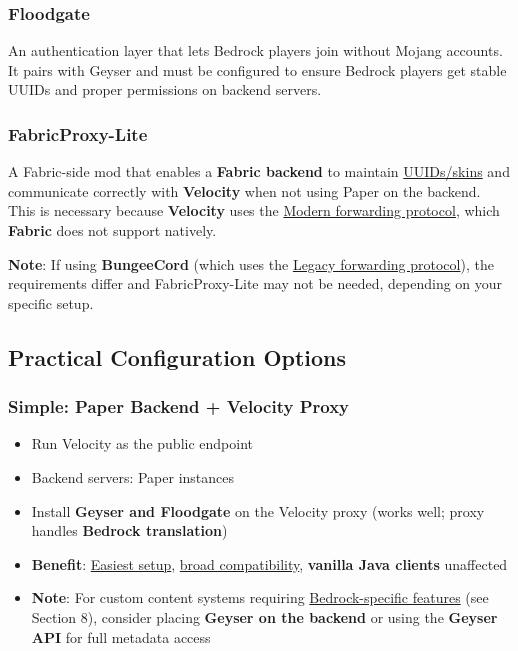 \documentclass{article}
\begin{document}
\subsubsection{Floodgate}

An authentication layer that lets Bedrock players join without Mojang accounts. It pairs with Geyser and must be configured to ensure Bedrock players get stable UUIDs and proper permissions on backend servers.

\subsubsection{FabricProxy-Lite}

A Fabric-side mod that enables a \textbf{Fabric backend} to maintain \uline{UUIDs/skins} and communicate correctly with \textbf{Velocity} when not using Paper on the backend. This is necessary because \textbf{Velocity} uses the \uline{Modern forwarding protocol}, which \textbf{Fabric} does not support natively. 

\textbf{Note}: If using \textbf{BungeeCord} (which uses the \uline{Legacy forwarding protocol}), the requirements differ and FabricProxy-Lite may not be needed, depending on your specific setup.


\newpage
\subsection{Practical Configuration Options}

\subsubsection{Simple: Paper Backend + Velocity Proxy}

\begin{itemize}
    \item Run Velocity as the public endpoint
    \item Backend servers: Paper instances
    \item Install \textbf{Geyser and Floodgate} on the Velocity proxy (works well; proxy handles \textbf{Bedrock translation})
    \item \textbf{Benefit}: \uline{Easiest setup}, \uline{broad compatibility}, \textbf{vanilla Java clients} unaffected
    \item \textbf{Note}: For custom content systems requiring \uline{Bedrock-specific features} (see Section 8), consider placing \textbf{Geyser on the backend} or using the \textbf{Geyser API} for full metadata access
\end{itemize}
\end{document}
